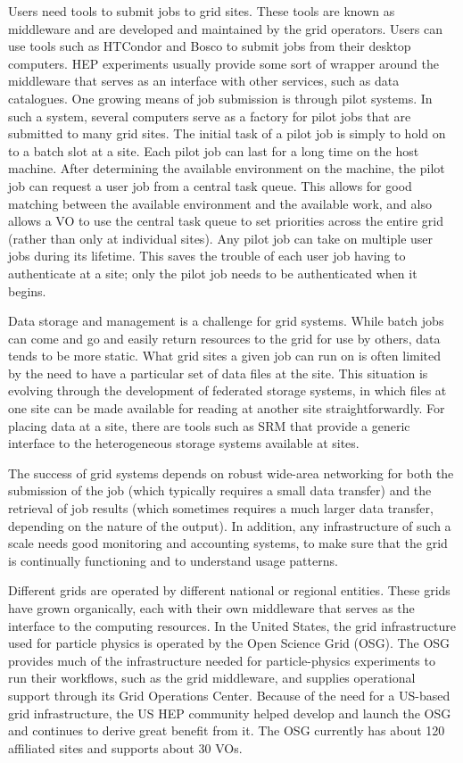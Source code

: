 Users need tools to submit jobs to grid sites.  These tools are known as middleware and are developed and maintained by the grid operators.  Users can use tools such as HTCondor and Bosco to submit jobs from their desktop computers.  HEP experiments usually provide some sort of wrapper around the middleware that serves as an interface with other services, such as data catalogues.  One growing means of job submission is through pilot systems.  In such a system, several computers serve as a factory for pilot jobs that are submitted to many grid sites.  The initial task of a pilot job is simply to hold on to a batch slot at a site.  Each pilot job can last for a long time on the host machine.  After determining the available environment on the machine, the pilot job can request a user job from a central task queue.  This allows for good matching between the available environment and the available work, and also allows a VO to use the central task queue to set priorities across the entire grid (rather than only at individual sites).  Any pilot job can take on multiple user jobs during its lifetime.  This saves the trouble of each user job having to authenticate at a site; only the pilot job needs to be authenticated when it begins.

Data storage and management is a challenge for grid systems.  While batch jobs can come and go and easily return resources to the grid for use by others, data tends to be more static.  What grid sites a given job can run on is often limited by the need to have a particular set of data files at the site.  This situation is evolving through the development of federated storage systems, in which files at one site can be made available for reading at another site straightforwardly.  For placing data at a site, there are tools such as SRM that provide a generic interface to the heterogeneous storage systems available at sites.

The success of grid systems depends on robust wide-area networking for both the submission of the job (which typically requires a small data transfer) and the retrieval of job results (which sometimes requires a much larger data transfer, depending on the nature of the output).  In addition, any infrastructure of such a scale needs good monitoring and accounting systems, to make sure that the grid is continually functioning and to understand usage patterns.

Different grids are operated by different national or regional entities.  These grids have grown organically, each with their own middleware that serves as the interface to the computing resources.  In the United States, the grid infrastructure used for particle physics is operated by the Open Science Grid (OSG).  The OSG provides much of the infrastructure needed for particle-physics experiments to run their workflows, such as the grid middleware, and supplies operational support through its Grid Operations Center.  Because of the need for a US-based grid infrastructure, the US HEP community helped develop and launch the OSG and continues to derive great benefit from it.  The OSG currently has about 120 affiliated sites and supports about 30 VOs.  


